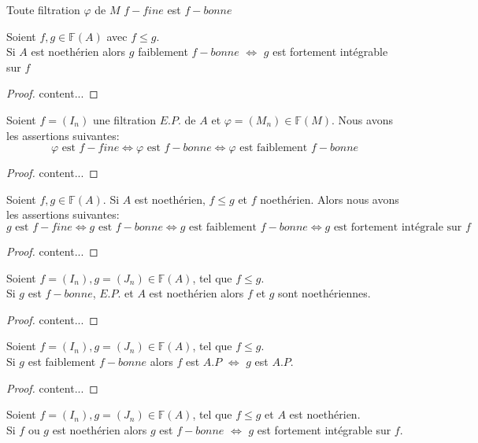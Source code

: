 \begin{maproposition}
	Toute filtration $\varphi$ de $M$ $f-fine$ est $f-bonne$
\end{maproposition}
\begin{maproposition}
	Soient $f,g \in \mathbb{F}(A)$ avec $f \leqslant g$.\\ Si $A$ est noethérien alors $g$ faiblement $f-bonne$ $\Longleftrightarrow$ $g$ est fortement intégrable sur $f$
\end{maproposition}
\begin{proof}
	content...
\end{proof}
\begin{maproposition}
	Soient $f=(I_n)$ une filtration $E.P.$ de $A$ et $\varphi=(M_n) \in \mathbb{F}(M)$. Nous avons les assertions suivantes:
	\[ \varphi \text{ est } f-fine \Longleftrightarrow \varphi \text{ est } f-bonne \Longleftrightarrow \varphi \text{ est faiblement } f-bonne   \]
\end{maproposition}
\begin{proof}
	content...
\end{proof}
\begin{moncorollaire}
	Soient $f,g \in \mathbb{F}(A)$. Si $A$ est noethérien, $f \leqslant g$ et $f$ noethérien. Alors nous avons les assertions suivantes:
	\[ g \text{ est } f-fine \Longleftrightarrow  g \text{ est } f-bonne \Longleftrightarrow  g \text{ est faiblement } f-bonne \Longleftrightarrow  g \text{ est fortement intégrale sur } f \]
\end{moncorollaire}
\begin{proof}
	content...
\end{proof}
\begin{maproposition}
	Soient $f=(I_n), g=(J_n) \in \mathbb{F}(A)$, tel que $f \leqslant g$.\\ Si $g$ est $f-bonne$, $E.P.$ et $A$ est noethérien alors $f$ et $g$ sont noethériennes.
\end{maproposition}
\begin{proof}
	content...
\end{proof}
\begin{maproposition}
	Soient $f=(I_n), g=(J_n) \in \mathbb{F}(A)$, tel que $f \leqslant g$.\\ Si $g$ est faiblement $f-bonne$ alors $f$ est $A.P$ $\Longleftrightarrow$ $g$ est $A.P$.
\end{maproposition}
\begin{proof}
	content...
\end{proof}
\begin{moncorollaire}
	Soient $f=(I_n), g=(J_n) \in \mathbb{F}(A)$, tel que $f \leqslant g$ et $A$ est noethérien.\\ Si $f$ ou $g$ est noethérien alors $g$ est $f-bonne$ $\Longleftrightarrow$ $g$ est fortement intégrable sur $f$.
\end{moncorollaire}
